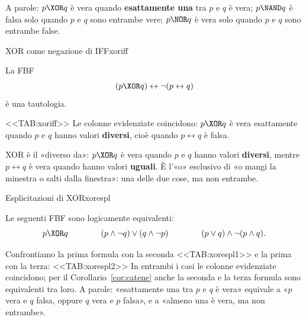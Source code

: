 A parole: $p \XOR q$ è vera quando \textbf{esattamente una} tra $p$ e $q$ è vera; $p \NAND q$ è falsa solo quando
$p$ e $q$ sono entrambe vere; $p \NOR q$ è vera solo quando $p$ e $q$ sono entrambe false.

\begin{concetto}
\begin{Proposizione}{XOR come negazione di IFF}{xoriff}
    \begin{prerequisiti}
    \end{prerequisiti}
    La FBF
    \[ (p \XOR q) \leftrightarrow \neg(p \leftrightarrow q) \]
    è una tautologia.
\end{Proposizione}

\begin{dimostrazione}
    <<TAB:xoriff>>
    Le colonne evidenziate coincidono: $p \XOR q$ è vera esattamente quando $p$ e $q$ hanno valori \textbf{diversi},
    cioè quando $p \leftrightarrow q$ è falsa.
\end{dimostrazione}
\end{concetto}

\begin{spiegazione}
    XOR è il «diverso da»: $p \XOR q$ è vera quando $p$ e $q$ hanno valori \textbf{diversi}, mentre $p \leftrightarrow q$ è vera quando hanno valori \textbf{uguali}. È l'«o»
    esclusivo di «o mangi la minestra o salti dalla finestra»: una delle due cose, ma non entrambe.
\end{spiegazione}


\begin{concetto}
\begin{Proposizione}{Esplicitazioni di XOR}{xorespl}
    \begin{prerequisiti}
    \end{prerequisiti}
    Le seguenti FBF sono logicamente equivalenti:
    \[ p \XOR q \qquad\qquad (p \wedge \neg q) \vee (q \wedge \neg p) \qquad\qquad (p \vee q) \wedge \neg(p \wedge q). \]
\end{Proposizione}

\begin{dimostrazione}
    Confrontiamo la prima formula con la seconda
    <<TAB:xorespl1>>
    e la prima con la terza:
    <<TAB:xorespl2>>
    In entrambi i casi le colonne evidenziate coincidono; per il Corollario~\ref{cor:catene} anche la seconda
    e la terza formula sono equivalenti tra loro. A parole: «esattamente una tra $p$ e $q$ è vera» equivale a
    «$p$ vera e $q$ falsa, oppure $q$ vera e $p$ falsa», e a «almeno una è vera, ma non entrambe».
\end{dimostrazione}
\end{concetto}

